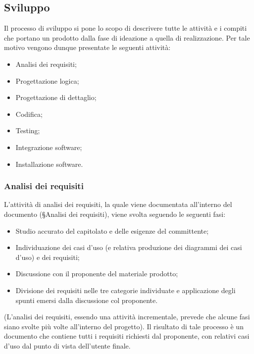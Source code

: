 \documentclass[10pt, a4paper]{article}
\begin{document}
\subsection{Sviluppo}
Il processo di sviluppo si pone lo scopo di descrivere tutte le attività e i compiti che portano un prodotto dalla fase di ideazione a quella di realizzazione. 
Per tale motivo vengono dunque presentate le seguenti attività:
\begin{itemize}
    \item Analisi dei requisiti;
    \item Progettazione logica;
    \item Progettazione di dettaglio;
    \item Codifica;
    \item Testing;
    \item Integrazione software;
    \item Installazione software.
\end{itemize}

\subsubsection{Analisi dei requisiti}
L'attività di analisi dei requisiti, la quale viene documentata all'interno del documento (\S Analisi dei requisiti), viene svolta seguendo le seguenti fasi:
\begin{itemize}
    \item Studio accurato del capitolato e delle esigenze del committente;
    \item Individuazione dei casi d'uso (e relativa produzione dei diagrammi dei casi d'uso) e dei requisiti;
    \item Discussione con il proponente del materiale prodotto;
    \item Divisione dei requisiti nelle tre categorie individuate e applicazione degli spunti emersi dalla discussione col proponente.
\end{itemize}
(L'analisi dei requisiti, essendo una attività incrementale, prevede che alcune fasi siano svolte più volte all'interno del progetto).
Il risultato di tale processo è un documento che contiene tutti i requisiti richiesti dal proponente, con relativi casi d'uso dal punto di vista dell'utente finale.
\end{document}
